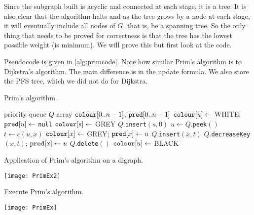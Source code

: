 Since the subgraph built is acyclic and connected at each stage, it is a tree.
It is also clear that the algorithm halts and as the tree grows by a node at each stage, 
it will eventually include all nodes of $G$, that is, be a spanning tree. 
So the only thing that needs to be proved for correctness is that the tree has the lowest possible weight (is minimum). 
We will prove this but first look at the code.

Pseudocode is given in \cref{alg:primcode}. 
Note how similar Prim's algorithm is to Dijkstra's algorithm. 
The main difference is in the update formula. We also store the PFS tree, which we did not do for Dijkstra.

\begin{algorithm}[H]
  \caption{Prim's algorithm.}
  \label{alg:primcode}
\begin{algorithmic}[1]
	\State priority queue $Q$
	\State array $\operatorname{\text{\texttt{colour}}}[0..n-1]$, $\operatorname{\text{\texttt{pred}}}[0..n-1]$
		\State $\operatorname{\text{\texttt{colour}}}[u] \gets$ WHITE; $\operatorname{\text{\texttt{pred}}}[u] \gets$ \texttt{null} 
	\EndFor
	\State $\operatorname{\text{\texttt{colour}}}[s] \gets $ GREY
	\State $Q$.\texttt{insert}$(s, 0)$
		\State $u \gets Q$.\texttt{peek}$()$
			\State $t \gets c(u, x)$
				\State $\operatorname{\text{\texttt{colour}}}[x] \gets $ GREY; $\operatorname{\text{\texttt{pred}}}[x] \gets u$
				\State $Q$.\texttt{insert}$(x, t)$
				\State $Q$.\texttt{decreaseKey}$(x, t)$; $\operatorname{\text{\texttt{pred}}}[x] \gets u$
			\EndIf
		\EndFor
		\State $Q$.\texttt{delete}$()$
		\State $\operatorname{\text{\texttt{colour}}}[u] \gets $ BLACK
	\EndWhile
	\State \Return{$\pred$}
\EndFunction
\end{algorithmic}
\end{algorithm}


\begin{Boxample}
Application of Prim's algorithm on a digraph.
\begin{center}
\texttt{[image: PrimEx2]}
\end{center}
\end{Boxample}

\begin{Boxample}[0.2]
Execute Prim's algorithm.\\

\begin{center}
\texttt{[image: PrimEx]}
\end{center}
\end{Boxample}


